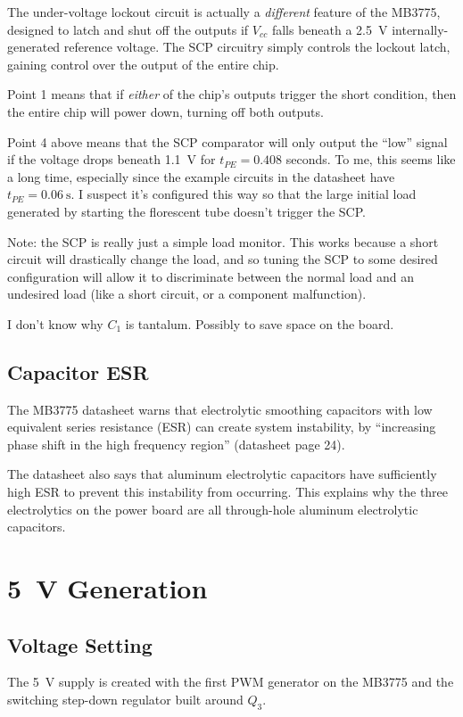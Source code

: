 \documentclass{article}
\newcommand{\Vcc}{$V_{cc}$}
\newcommand{\model}{\textsf}
\begin{document}
The under-voltage lockout circuit is actually a \emph{different}
feature of the \model{MB3775}, designed to latch and shut off the
outputs if \Vcc{} falls beneath a \qty{2.5}{\volt}
internally-generated reference voltage. The SCP circuitry simply
controls the lockout latch, gaining control over the output of the
entire chip.

Point 1 means that if \emph{either} of the chip's outputs trigger the
short condition, then the entire chip will power down, turning off
both outputs.

Point 4 above means that the SCP comparator will only output the
``low'' signal if the voltage drops beneath \qty{1.1}{\volt} for
$t_{PE} = 0.408$ seconds. To me, this seems like a long time,
especially since the example circuits in the datasheet have
$t_{PE} = \qty{0.06}{\second}$. I suspect it's configured this way so
that the large initial load generated by starting the florescent tube
doesn't trigger the SCP.

Note: the SCP is really just a simple load monitor. This works because
a short circuit will drastically change the load, and so tuning the
SCP to some desired configuration will allow it to discriminate
between the normal load and an undesired load (like a short circuit, or
a component malfunction).

I don't know why $C_1$ is tantalum. Possibly to save space on the board.

% 
\subsection{Capacitor ESR}
The \model{MB3775} datasheet warns that electrolytic smoothing
capacitors with low equivalent series resistance (ESR) can create
system instability, by ``increasing phase shift in the high frequency
region'' (datasheet page 24).

The datasheet also says that aluminum electrolytic capacitors have
sufficiently high ESR to prevent this instability from occurring. This
explains why the three electrolytics on the power board are all
through-hole aluminum electrolytic capacitors.

\section{\qty{5}{\volt} Generation}
\subsection{Voltage Setting}
The \qty{5}{\volt} supply is created with the first PWM generator on
the \model{MB3775} and the switching step-down regulator built around
$Q_3$.
\end{document}
